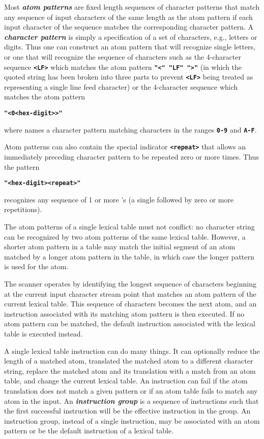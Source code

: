 \documentclass[12pt]{article}
\newcommand{\TT}[1]{{\tt \bfseries #1}}
\newcommand{\key}[1]{{\bf \em #1}\index{#1}}
\newcommand{\skey}[2]{{\bf \em #1#2}\index{#1}}
\begin{document}
Most \skey{atom pattern}s are fixed
length sequences of character patterns that match any sequence of
input characters of the same length as the atom pattern
if each input character of the sequence matches the corresponding
character pattern.  A \key{character pattern} is simply a
specification of a set of characters, e.g., letters or digits.
Thus one can construct an atom pattern that will recognize
single letters, or one that will recognize the sequence of
characters such as the 4-character sequence \TT{<LF>} which matches
the atom pattern \TT{"<" "LF" ">"}
(in which the quoted string has been broken into three parts to prevent
\TT{<LF>} being treated as representing a single line feed character)
or the 4-character sequence \TT{<0A>} which matches the atom pattern
\begin{center}
\TT{"<0<hex-digit>{}>"}
\end{center}
where \TT{<hex-digit>} names a character pattern matching characters
in the ranges \TT{0-9} and \TT{A-F}.

Atom patterns can also contain the special indicator
\TT{<repeat>} that allows an immediately preceding character pattern
to be repeated zero or more times.  Thus the pattern
\begin{center}
\TT{"<hex-digit><repeat>"}
\end{center}
recognizes any sequence of 1 or more \TT{<hex-digit>}'s (a single
\TT{<hex-digit>} followed by zero or more repetitions).

The atom patterns of a single lexical table must not conflict:
no character string can be recognized by two atom patterns of the
same lexical table.  However, a shorter atom pattern in a
table may match the initial segment of an atom matched by a longer
atom pattern in the table, in which case the longer pattern is
used for the atom.

The scanner operates by identifying the
longest sequence of characters beginning at the current input character
stream point that matches an atom pattern of the current lexical table.
This sequence of characters becomes
the next atom, and an instruction associated with its matching
atom pattern is then executed.  If no atom pattern can be matched,
the default instruction associated with the lexical table is executed instead.

A single lexical table instruction can do many things.
It can optionally reduce the length of a matched atom,
translated the matched atom to a different character string,
replace the matched atom and its translation with a match from an atom table,
and change the current lexical table.
An instruction can fail if the atom translation does not match a given pattern
or if an atom table fails to match any atom in the input.
An \key{instruction group} is a sequence of instructions
such that the first successful instruction will be the effective
instruction in the group.  An instruction group, instead of a single
instruction, may be associated with an atom pattern or be the default
instruction of a lexical table.
\end{document}
